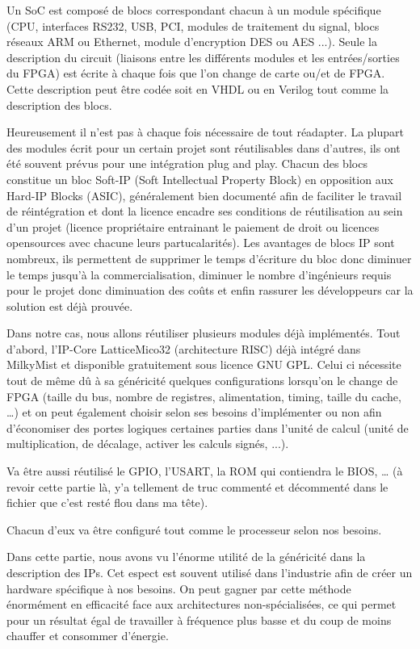 \vspace{15px}

Un SoC est composé de blocs correspondant chacun à un module spécifique (CPU, interfaces RS232, USB, PCI, modules de traitement du signal, blocs réseaux ARM ou Ethernet, module d'encryption DES ou AES ...). Seule la description du circuit (liaisons entre les différents modules et les entrées/sorties du FPGA) est écrite à chaque fois que l'on change de carte ou/et de FPGA. Cette description peut être codée soit en VHDL ou en Verilog tout comme la description des blocs.

Heureusement il n'est pas à chaque fois nécessaire de tout réadapter. La plupart des modules écrit pour un certain projet sont réutilisables dans d'autres, ils ont été souvent prévus pour une intégration plug and play. Chacun des blocs constitue un bloc Soft-IP (Soft Intellectual Property Block) en opposition aux Hard-IP Blocks (ASIC), généralement bien documenté afin de faciliter le travail de réintégration et dont la licence encadre ses conditions de réutilisation au sein d'un projet (licence propriétaire entrainant le paiement de droit ou licences opensources avec chacune leurs partucalarités). Les avantages de blocs IP sont nombreux, ils permettent de supprimer le temps d'écriture du bloc donc diminuer le temps jusqu'à la commercialisation, diminuer le nombre d'ingénieurs requis pour le projet donc diminuation des coûts  et enfin rassurer les développeurs car la solution est déjà prouvée.

Dans notre cas, nous allons réutiliser plusieurs modules déjà implémentés. Tout d'abord, l'IP-Core LatticeMico32 (architecture RISC) déjà intégré dans MilkyMist et disponible gratuitement sous licence GNU GPL. Celui ci nécessite tout de même dû à sa généricité quelques configurations lorsqu'on le change de FPGA (taille du bus, nombre de registres, alimentation, timing, taille du cache, …) et on peut également choisir selon ses besoins d'implémenter ou non afin d'économiser des portes logiques certaines parties dans l'unité de calcul (unité de multiplication, de décalage, activer les calculs signés, ...).

Va être aussi réutilisé le GPIO, l'USART, la ROM qui contiendra le BIOS, … (à revoir cette partie là, y'a tellement de truc commenté et décommenté dans le fichier que c'est resté flou dans ma tête).

Chacun d'eux va être configuré tout comme le processeur selon nos besoins.

Dans cette partie, nous avons vu l'énorme utilité de la généricité dans la description des IPs. Cet espect est souvent utilisé dans l'industrie afin de créer un hardware spécifique à nos besoins. On peut gagner par cette méthode énormément en efficacité face aux architectures non-spécialisées, ce qui permet pour un résultat égal de travailler à fréquence plus basse et du coup de moins chauffer et consommer d'énergie.